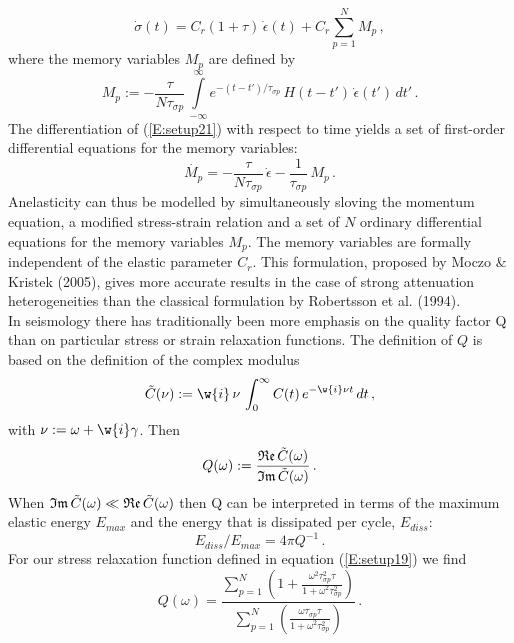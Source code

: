 \begin{equation}\label{E:setup20}
\dot{\sigma}(t) = C_r (1+\tau)\,\dot{\epsilon}(t) + C_r
\sum_{p=1}^{N} M_p\,,
\end{equation}
where the memory variables $M_p$ are defined by
\begin{equation}\label{E:setup21}
M_p := -\frac{\tau}{N \tau_{\sigma
p}}\,\int\limits_{-\infty}^{\infty} e^{-(t-t')/\tau_{\sigma p}}\,
H(t-t')\,\dot{\epsilon}(t')\, dt'\,.
\end{equation}
The differentiation of (\ref{E:setup21}) with respect to time yields
a set of first-order differential equations for the memory
variables:
\begin{equation}\label{E:setup22}
\dot{M_p} = -\frac{\tau}{N \tau_{\sigma p}} \, \dot{\epsilon} -
\frac{1}{\tau_{\sigma p}}\, M_p\,.
\end{equation}
Anelasticity can thus be modelled by simultaneously sloving the
momentum equation, a modified stress-strain relation and a set of
$N$ ordinary differential equations for the memory variables $M_p$.
The memory variables are formally independent of the elastic
parameter $C_r$. This formulation, proposed by Moczo \& Kristek
(2005),
gives more accurate results in the case of strong attenuation heterogeneities than the classical formulation by Robertsson et al. (1994).\\
In seismology there has traditionally been more emphasis on the
quality factor Q than on particular stress or strain relaxation
functions. The definition of $Q$ is based on the definition of the
complex modulus
\begin{equation}\label{E:setup28}
\tilde{C}(\nu) := \w{i}\,\nu\,\int_{0}^{\infty} C(t)\,e^{-\w{i}\nu
t}\, dt\,,
\end{equation}
with $\nu:=\omega+\w{i}\gamma$. Then
\begin{equation}\label{E:setup29}
Q(\omega) :=
\frac{\frak{Re}\,\tilde{C}(\omega)}{\frak{Im}\,\tilde{C}(\omega)}\,.
\end{equation}
When $\frak{Im}\,\tilde{C}(\omega) \ll \frak{Re}\,\tilde{C}(\omega)$
then Q can be interpreted in terms of the maximum elastic energy
$E_{max}$ and the energy that is dissipated per cycle, $E_{diss}$:
\begin{equation}\label{E:setup30}
E_{diss} / E_{max} = 4\pi Q^{-1}\,.
\end{equation}
For our stress relaxation function defined in equation
(\ref{E:setup19}) we find
\begin{equation}\label{E:setup31}
Q(\omega) = \frac{\sum_{p=1}^{N} \left( 1+ \frac{\omega^2
\tau_{\sigma p}^2\tau}{1+\omega^2 \tau_{\sigma p}^2} \right)}{
\sum_{p=1}^{N} \left( \frac{\omega \tau_{\sigma p}
\tau}{1+\omega^2\tau_{\sigma p}^2} \right)}\,.
\end{equation}
